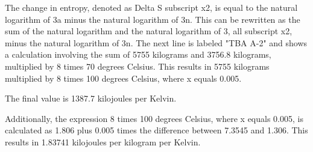 The change in entropy, denoted as Delta S subscript x2, is equal to the natural logarithm of 3a minus the natural logarithm of 3n. This can be rewritten as the sum of the natural logarithm and the natural logarithm of 3, all subscript x2, minus the natural logarithm of 3n. The next line is labeled "TBA A-2" and shows a calculation involving the sum of 5755 kilograms and 3756.8 kilograms, multiplied by 8 times 70 degrees Celsius. This results in 5755 kilograms multiplied by 8 times 100 degrees Celsius, where x equals 0.005.

The final value is 1387.7 kilojoules per Kelvin.

Additionally, the expression 8 times 100 degrees Celsius, where x equals 0.005, is calculated as 1.806 plus 0.005 times the difference between 7.3545 and 1.306. This results in 1.83741 kilojoules per kilogram per Kelvin.